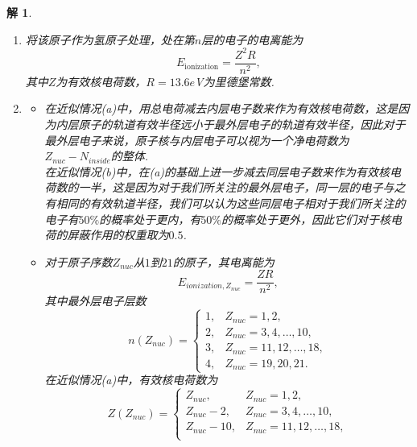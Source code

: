 \documentclass[UTF8,10pt,a4paper]{article}
\theoremstyle{Problem}
\theoremstyle{Solution}
\newtheorem*{sol}{解}
\begin{document}
\begin{sol}
    \begin{enumerate}
        \item[(a)] 将该原子作为氢原子处理，处在第$n$层的电子的电离能为
        \begin{equation}
            E_{\text{ionization}}=\frac{Z^2R}{n^2},
        \end{equation}
        其中$Z$为有效核电荷数，$R=13.6e$V为里德堡常数.
        \item[(b)]
        \begin{itemize}
            \item[$\triangleright$] 在近似情况(a)中，用总电荷减去内层电子数来作为有效核电荷数，这是因为内层原子的轨道有效半径远小于最外层电子的轨道有效半径，因此对于最外层电子来说，原子核与内层电子可以视为一个净电荷数为$Z_{nuc}-N_{inside}$的整体.\\
            在近似情况(b)中，在(a)的基础上进一步减去同层电子数来作为有效核电荷数的一半，这是因为对于我们所关注的最外层电子，同一层的电子与之有相同的有效轨道半径，我们可以认为这些同层电子相对于我们所关注的电子有$50\%$的概率处于更内，有$50\%$的概率处于更外，因此它们对于核电荷的屏蔽作用的权重取为$0.5$.
            \item[$\triangleright$] 对于原子序数$Z_{nuc}$从$1$到$21$的原子，其电离能为
            \begin{equation}
                E_{ionization,Z_{nuc}}=\frac{ZR}{n^2},
            \end{equation}
            其中最外层电子层数
            \begin{equation}
                n(Z_{nuc})=\left\{\begin{array}{ll}
                    1,&Z_{nuc}=1,2,\\
                    2,&Z_{nuc}=3,4,\dots,10,\\
                    3,&Z_{nuc}=11,12,\dots,18,\\
                    4,&Z_{nuc}=19,20,21.
                \end{array}\right.
            \end{equation}
            在近似情况(a)中，有效核电荷数为
            \begin{equation}
                Z(Z_{nuc})=\left\{\begin{array}{ll}
                    Z_{nuc},&Z_{nuc}=1,2,\\
                    Z_{nuc}-2,&Z_{nuc}=3,4,\dots,10,\\
                    Z_{nuc}-10,&Z_{nuc}=11,12,\dots,18,\\

\end{array}
\end{equation}
\end{itemize}
\end{enumerate}
\end{sol}
\end{document}
